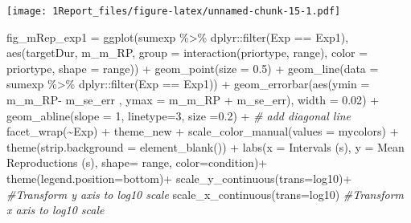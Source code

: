 \documentclass[
]{article}
\newenvironment{Shaded}{\begin{snugshade}}{\end{snugshade}}
\newcommand{\AttributeTok}[1]{\textcolor[rgb]{0.77,0.63,0.00}{#1}}
\newcommand{\CommentTok}[1]{\textcolor[rgb]{0.56,0.35,0.01}{\textit{#1}}}
\newcommand{\DecValTok}[1]{\textcolor[rgb]{0.00,0.00,0.81}{#1}}
\newcommand{\FloatTok}[1]{\textcolor[rgb]{0.00,0.00,0.81}{#1}}
\newcommand{\FunctionTok}[1]{\textcolor[rgb]{0.00,0.00,0.00}{#1}}
\newcommand{\NormalTok}[1]{#1}
\newcommand{\OtherTok}[1]{\textcolor[rgb]{0.56,0.35,0.01}{#1}}
\newcommand{\SpecialCharTok}[1]{\textcolor[rgb]{0.00,0.00,0.00}{#1}}
\newcommand{\StringTok}[1]{\textcolor[rgb]{0.31,0.60,0.02}{#1}}
\begin{document}
\texttt{[image: 1Report\_files/figure-latex/unnamed-chunk-15-1.pdf]}

\begin{Shaded}
\begin{Highlighting}[]
\NormalTok{fig\_mRep\_exp1 }\OtherTok{=} \FunctionTok{ggplot}\NormalTok{(sumexp }\SpecialCharTok{\%\textgreater{}\%}\NormalTok{  dplyr}\SpecialCharTok{::}\FunctionTok{filter}\NormalTok{(Exp }\SpecialCharTok{==} \StringTok{\textquotesingle{}Exp1\textquotesingle{}}\NormalTok{),}
                       \FunctionTok{aes}\NormalTok{(targetDur, m\_m\_RP, }\AttributeTok{group =} \FunctionTok{interaction}\NormalTok{(priortype, range), }\AttributeTok{color =}\NormalTok{ priortype, }\AttributeTok{shape =}\NormalTok{ range)) }\SpecialCharTok{+} 
  \FunctionTok{geom\_point}\NormalTok{(}\AttributeTok{size =} \FloatTok{0.5}\NormalTok{) }\SpecialCharTok{+} 
  \FunctionTok{geom\_line}\NormalTok{(}\AttributeTok{data =}\NormalTok{ sumexp }\SpecialCharTok{\%\textgreater{}\%}\NormalTok{  dplyr}\SpecialCharTok{::}\FunctionTok{filter}\NormalTok{(Exp }\SpecialCharTok{==} \StringTok{\textquotesingle{}Exp1\textquotesingle{}}\NormalTok{)) }\SpecialCharTok{+} 
  \FunctionTok{geom\_errorbar}\NormalTok{(}\FunctionTok{aes}\NormalTok{(}\AttributeTok{ymin =}\NormalTok{ m\_m\_RP}\SpecialCharTok{{-}}\NormalTok{ m\_se\_err , }\AttributeTok{ymax =}\NormalTok{ m\_m\_RP }\SpecialCharTok{+}\NormalTok{ m\_se\_err), }\AttributeTok{width =} \FloatTok{0.02}\NormalTok{) }\SpecialCharTok{+} 
  \FunctionTok{geom\_abline}\NormalTok{(}\AttributeTok{slope =} \DecValTok{1}\NormalTok{, }\AttributeTok{linetype=}\DecValTok{3}\NormalTok{, }\AttributeTok{size =}\FloatTok{0.2}\NormalTok{) }\SpecialCharTok{+} \CommentTok{\# add diagonal line}
  \FunctionTok{facet\_wrap}\NormalTok{(}\SpecialCharTok{\textasciitilde{}}\NormalTok{Exp) }\SpecialCharTok{+}
\NormalTok{  theme\_new }\SpecialCharTok{+} \FunctionTok{scale\_color\_manual}\NormalTok{(}\AttributeTok{values =}\NormalTok{ mycolors) }\SpecialCharTok{+}
  \FunctionTok{theme}\NormalTok{(}\AttributeTok{strip.background =} \FunctionTok{element\_blank}\NormalTok{()) }\SpecialCharTok{+} 
  \FunctionTok{labs}\NormalTok{(}\AttributeTok{x =} \StringTok{\textquotesingle{}Intervals (s)\textquotesingle{}}\NormalTok{, }\AttributeTok{y =} \StringTok{\textquotesingle{}Mean Reproductions (s)\textquotesingle{}}\NormalTok{, }\AttributeTok{shape=} \StringTok{\textquotesingle{}range\textquotesingle{}}\NormalTok{, }\AttributeTok{color=}\StringTok{\textquotesingle{}condition\textquotesingle{}}\NormalTok{)}\SpecialCharTok{+} \FunctionTok{theme}\NormalTok{(}\AttributeTok{legend.position=}\StringTok{\textquotesingle{}bottom\textquotesingle{}}\NormalTok{)}\SpecialCharTok{+}
  \FunctionTok{scale\_y\_continuous}\NormalTok{(}\AttributeTok{trans=}\StringTok{\textquotesingle{}log10\textquotesingle{}}\NormalTok{)}\SpecialCharTok{+} \CommentTok{\#Transform y axis to log10 scale}
  \FunctionTok{scale\_x\_continuous}\NormalTok{(}\AttributeTok{trans=}\StringTok{\textquotesingle{}log10\textquotesingle{}}\NormalTok{) }\CommentTok{\#Transform x axis to log10 scale}


\end{Highlighting}
\end{Shaded}
\end{document}
